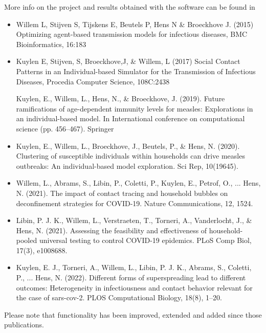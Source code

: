 More info on the project and results obtained with the software
can be found in
\begin{itemize}
\item Willem L, Stijven S, Tijskens E, Beutels P, Hens N \& Broeckhove J. (2015) Optimizing agent-based transmission models for infectious diseases, BMC Bioinformatics, 16:183 \cite{willem2015}
 
\item Kuylen E, Stijven, S, Broeckhove,J, \& Willem, L (2017) Social Contact Patterns in an Individual-based Simulator for the Transmission of Infectious Diseases, Procedia Computer Science, 108C:2438 \cite{kuylen2017}

Kuylen, E., Willem, L., Hens, N., \& Broeckhove, J. (2019). Future ramifications of age-dependent immunity levels for measles: Explorations in an individual-based model. In International conference on computational science (pp. 456–467). Springer \cite{kuylen2019future}
 
\item Kuylen, E., Willem, L., Broeckhove, J., Beutels, P., \& Hens, N. (2020). Clustering of susceptible individuals within households can drive measles outbreaks: An individual-based model exploration. Sci Rep, 10(19645). \cite{kuylen2020clustering}

\item Willem, L., Abrams, S., Libin, P., Coletti, P., Kuylen, E., Petrof, O., ... Hens, N. (2021). The impact of contact tracing and household bubbles on deconfinement strategies for COVID-19. Nature Communications, 12, 1524. \cite{willem2021impact}

\item Libin, P. J. K., Willem, L., Verstraeten, T., Torneri, A., Vanderlocht, J., \& Hens, N. (2021). Assessing the feasibility and effectiveness of household-pooled universal testing to control COVID-19 epidemics. PLoS Comp Biol, 17(3), e1008688. \cite{libin2021assessing}

\item Kuylen, E. J., Torneri, A., Willem, L., Libin, P. J. K., Abrams, S., Coletti, P., ... Hens, N. (2022). Different forms of superspreading lead to different outcomes: Heterogeneity in infectiousness and contact behavior relevant for the case of sars-cov-2. PLOS Computational Biology, 18(8), 1–20. \cite{kuylen2022different}

\end{itemize}

Please note that functionality has been improved, extended and added since those publications.


